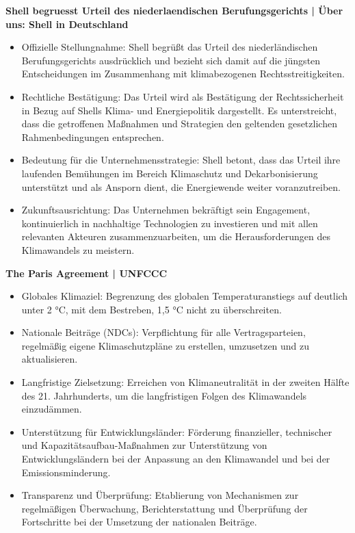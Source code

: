 \documentclass[a4paper, 12pt]{article} %
\begin{document}
\textbf{\cite{ShellBegruesstUrteil2024} Shell begruesst Urteil des niederlaendischen Berufungsgerichts | Über uns: Shell in Deutschland}

\begin{itemize}
   \item Offizielle Stellungnahme: Shell begrüßt das Urteil des niederländischen Berufungsgerichts ausdrücklich und bezieht sich damit auf die jüngsten Entscheidungen im Zusammenhang mit klimabezogenen Rechtsstreitigkeiten.
   \item Rechtliche Bestätigung: Das Urteil wird als Bestätigung der Rechtssicherheit in Bezug auf Shells Klima- und Energiepolitik dargestellt. Es unterstreicht, dass die getroffenen Maßnahmen und Strategien den geltenden gesetzlichen Rahmenbedingungen entsprechen.
   \item Bedeutung für die Unternehmensstrategie: Shell betont, dass das Urteil ihre laufenden Bemühungen im Bereich Klimaschutz und Dekarbonisierung unterstützt und als Ansporn dient, die Energiewende weiter voranzutreiben.
   \item Zukunftsausrichtung: Das Unternehmen bekräftigt sein Engagement, kontinuierlich in nachhaltige Technologien zu investieren und mit allen relevanten Akteuren zusammenzuarbeiten, um die Herausforderungen des Klimawandels zu meistern.
\end{itemize}

\textbf{\cite{ParisAgreementUNFCCC} The {{Paris Agreement}} | {{UNFCCC}}}

\begin{itemize}
   \item Globales Klimaziel: Begrenzung des globalen Temperaturanstiegs auf deutlich unter 2 °C, mit dem Bestreben, 1,5 °C nicht zu überschreiten.
   \item Nationale Beiträge (NDCs): Verpflichtung für alle Vertragsparteien, regelmäßig eigene Klimaschutzpläne zu erstellen, umzusetzen und zu aktualisieren.
   \item Langfristige Zielsetzung: Erreichen von Klimaneutralität in der zweiten Hälfte des 21. Jahrhunderts, um die langfristigen Folgen des Klimawandels einzudämmen.
   \item Unterstützung für Entwicklungsländer: Förderung finanzieller, technischer und Kapazitätsaufbau-Maßnahmen zur Unterstützung von Entwicklungsländern bei der Anpassung an den Klimawandel und bei der Emissionsminderung.
   \item Transparenz und Überprüfung: Etablierung von Mechanismen zur regelmäßigen Überwachung, Berichterstattung und Überprüfung der Fortschritte bei der Umsetzung der nationalen Beiträge.
\end{itemize}
\end{document}
